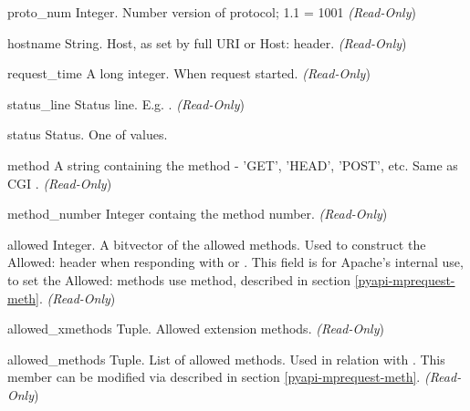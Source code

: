 \begin{memberdesc}[request]{proto_num}
  Integer. Number version of protocol; 1.1 = 1001 
  \emph{(Read-Only})
\end{memberdesc}

\begin{memberdesc}[request]{hostname}
  String. Host, as set by full URI or Host: header.
  \emph{(Read-Only})
\end{memberdesc}

\begin{memberdesc}[request]{request_time}
  A long integer. When request started.
  \emph{(Read-Only})
\end{memberdesc}

\begin{memberdesc}[request]{status_line}
  Status line. E.g. . 
  \emph{(Read-Only})
\end{memberdesc}

\begin{memberdesc}[request]{status}
  Status. One of  values.
\end{memberdesc}

\begin{memberdesc}[request]{method}
  A string containing the method - 'GET', 'HEAD', 'POST', etc.
  Same as CGI .
  \emph{(Read-Only})
\end{memberdesc}

\begin{memberdesc}[request]{method_number}
  Integer containg the method number.
  \emph{(Read-Only})
\end{memberdesc}

\begin{memberdesc}[request]{allowed}
  Integer. A bitvector of the allowed methods. Used to construct the
  Allowed: header when responding with
   or
  . This field is for Apache's internal
  use, to set the Allowed: methods use 
  method, described in section \ref{pyapi-mprequest-meth}. 
  \emph{(Read-Only})
\end{memberdesc}

\begin{memberdesc}[request]{allowed_xmethods}
  Tuple. Allowed extension methods.
  \emph{(Read-Only})
\end{memberdesc}

\begin{memberdesc}[request]{allowed_methods}
  Tuple. List of allowed methods. Used in relation with
  . This member can be modified via  
  described in section \ref{pyapi-mprequest-meth}.
  \emph{(Read-Only})
\end{memberdesc}

